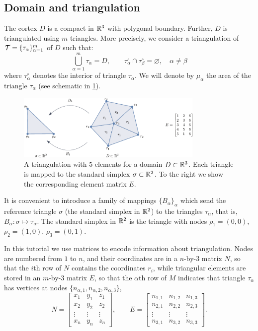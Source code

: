 \documentclass[a4paper]{siamonline220329}
\theoremstyle{plain}
\begin{document}
\subsection{Domain and triangulation} \label{ssec:triangulation}
The cortex $D$ is a compact in $\mathbb{R}^3$ with
polygonal boundary. Further, $D$ is triangulated using $m$ triangles. More precisely,
we consider a triangulation of $\mathcal{T} = \{ \tau_\alpha \}_{\alpha = 1}^m$ of $D$ such
that: \[ \bigcup_{\alpha=1}^m \tau_\alpha = D, \qquad \tau_\alpha^\circ \cap
\tau_\beta^\circ = \varnothing, \quad \alpha \neq \beta \] where $\tau_\alpha^\circ$
denotes the interior of triangle $\tau_{\alpha}$. We will denote by $\mu_\alpha$ the
area of the triangle $\tau_\alpha$ (see schematic in \cref{fig:triangulation}).

\begin{figure}
  \centering
  \includegraphics[width = 0.8\textwidth]{triangulation}
  \caption{A triangulation with $5$ elements for a domain $D \subset \mathbb{R}^3$. Each
  triangle is mapped to the standard simplex $\sigma \subset \mathbb{R}^2$. To the right
we show the corresponding element matrix $E$.}
  \label{fig:triangulation}
\end{figure}

It is convenient to introduce a family of mappings $\{ B_\alpha \}_{\alpha}$ which
send the reference triangle $\sigma$ (the standard simplex in $\mathbb{R}^2$) to the
triangles $\tau_\alpha$, that is, $B_\alpha \colon \sigma \mapsto \tau_{\alpha}$.
The standard simplex in $\mathbb{R}^2$ is the triangle with nodes $\rho_1=(0,0)$,
$\rho_2=(1,0)$, $\rho_3=(0,1)$.

In this tutorial we use matrices to encode information about triangulation. Nodes are
numbered from $1$ to $n$, and their coordinates are in a $n$-by-$3$ matrix $N$, so
that the $i$th row of $N$ contains the coordinates $r_i$, while triangular elements
are stored in an $m$-by-$3$ matrix $E$, so that the $\alpha$th row of $M$ indicates
that triangle $\tau_\alpha$ has vertices at nodes $\{ n_{\alpha,1},
  n_{\alpha,2}, n_{\alpha,3}\}$,
\[
  N =
  \begin{bmatrix} 
    x_1 & y_1 & z_1 \\
    x_2 & y_2 & z_2 \\
    \vdots & \vdots & \vdots \\
    x_n & y_n & z_n
  \end{bmatrix}, 
  \qquad 
  E =
  \begin{bmatrix} 
    n_{1,1} & n_{1,2} & n_{1,3}\\
    n_{2,1} & n_{2,2} & n_{2,3}\\
    \vdots & \vdots & \vdots \\
    n_{3,1} & n_{3,2} & n_{3,3}
  \end{bmatrix}.
\]
\end{document}
